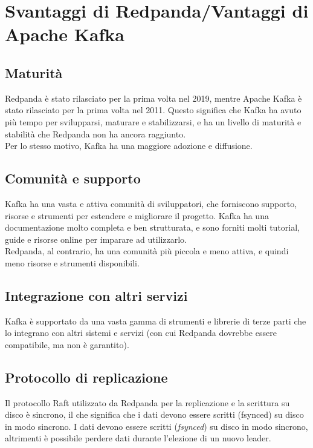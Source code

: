 \section{Svantaggi di Redpanda/Vantaggi di Apache Kafka}
\subsection{Maturità}
Redpanda è stato rilasciato per la prima volta nel 2019, mentre Apache Kafka è stato rilasciato
per la prima volta nel 2011. Questo significa che Kafka ha avuto più tempo per svilupparsi,
maturare e stabilizzarsi, e ha un livello di maturità e stabilità che Redpanda non
ha ancora raggiunto.\\
Per lo stesso motivo, Kafka ha una maggiore adozione e diffusione.

\subsection{Comunità e supporto}
Kafka ha una vasta e attiva comunità di sviluppatori, che forniscono supporto, risorse e strumenti per estendere e migliorare il progetto.
Kafka ha una documentazione molto completa e ben strutturata, e sono forniti molti tutorial, guide e risorse online per imparare ad utilizzarlo.\\
Redpanda, al contrario, ha una comunità più piccola e meno attiva, e quindi meno risorse e strumenti disponibili.\\

\subsection{Integrazione con altri servizi}
Kafka è supportato da una vasta gamma di strumenti e librerie di terze parti che lo integrano con altri sistemi e servizi
(con cui Redpanda dovrebbe essere compatibile, ma non è garantito).

\subsection{Protocollo di replicazione}
Il protocollo Raft utilizzato da Redpanda per la replicazione e la scrittura su disco è sincrono, il che significa che i dati devono essere scritti (fsynced) su disco in modo sincrono.
I dati devono essere scritti (\textit{fsynced}) su disco in modo sincrono, altrimenti è possibile perdere dati durante l'elezione di un nuovo leader.


